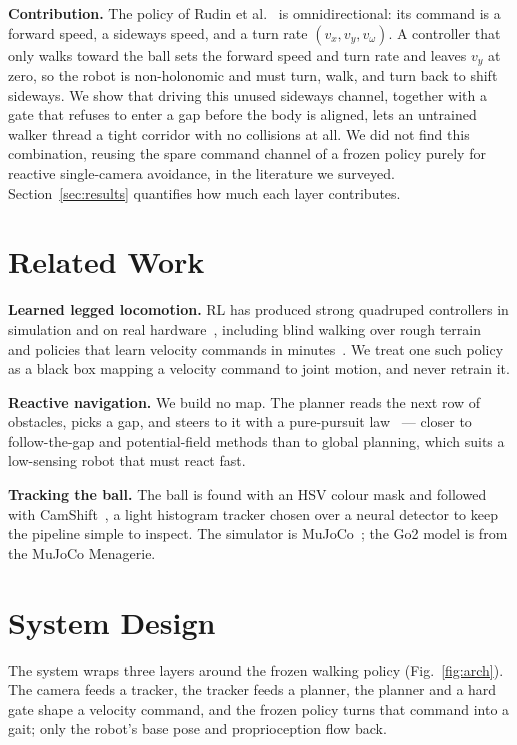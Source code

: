 \documentclass[conference]{IEEEtran}
\begin{document}
\textbf{Contribution.} The policy of Rudin et al.~\cite{rudin} is omnidirectional: its
command is a forward speed, a sideways speed, and a turn rate $(v_x, v_y, v_\omega)$. A
controller that only walks toward the ball sets the forward speed and turn rate and leaves
$v_y$ at zero, so the robot is non-holonomic and must turn, walk, and turn back to shift
sideways. We show that driving this unused sideways channel, together with a gate that
refuses to enter a gap before the body is aligned, lets an untrained walker thread a tight
corridor with no collisions at all. We did not find this combination, reusing the spare
command channel of a frozen policy purely for reactive single-camera avoidance, in the
literature we surveyed. Section~\ref{sec:results} quantifies how much each layer
contributes.

\section{Related Work}
\textbf{Learned legged locomotion.} RL has produced strong quadruped controllers in
simulation and on real hardware~\cite{hwangbo}, including blind walking over rough
terrain~\cite{lee} and policies that learn velocity commands in minutes~\cite{rudin}. We
treat one such policy as a black box mapping a velocity command to joint motion, and never
retrain it.

\textbf{Reactive navigation.} We build no map. The planner reads the next row of
obstacles, picks a gap, and steers to it with a pure-pursuit law~\cite{coulter} --- closer
to follow-the-gap and potential-field methods than to global planning, which suits a
low-sensing robot that must react fast.

\textbf{Tracking the ball.} The ball is found with an HSV colour mask and followed with
CamShift~\cite{bradski}, a light histogram tracker chosen over a neural detector to keep
the pipeline simple to inspect. The simulator is MuJoCo~\cite{mujoco}; the Go2 model is
from the MuJoCo Menagerie.

\section{System Design}
The system wraps three layers around the frozen walking policy (Fig.~\ref{fig:arch}). The
camera feeds a tracker, the tracker feeds a planner, the planner and a hard gate shape a
velocity command, and the frozen policy turns that command into a gait; only the robot's
base pose and proprioception flow back.
\end{document}
